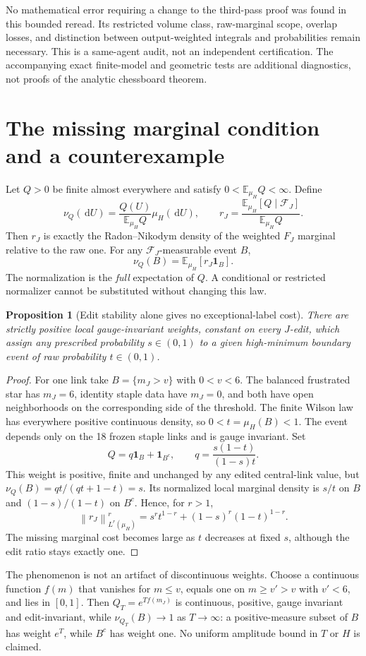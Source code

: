 \documentclass[11pt]{article}
\newtheorem{proposition}[theorem]{Proposition}
\theoremstyle{definition}
\theoremstyle{remark}
\newcommand{\one}{\mathbf 1}
\newcommand{\E}{\mathbb E}
\newcommand{\dd}{\,\mathrm d}
\newcommand{\norm}[1]{\left\lVert#1\right\rVert}
\begin{document}
No mathematical error requiring a change to the third-pass proof was
found in this bounded reread. Its restricted volume class, raw-marginal
scope, overlap losses, and distinction between output-weighted integrals
and probabilities remain necessary. This is a same-agent audit, not an
independent certification. The accompanying exact finite-model and
geometric tests are additional diagnostics, not proofs of the analytic
chessboard theorem.

\section{The missing marginal condition and a counterexample}
Let $Q>0$ be finite almost everywhere and satisfy
$0<\E_{\mu_H}Q<\infty$. Define
\[
 \nu_Q(\dd U)=\frac{Q(U)}{\E_{\mu_H}Q}\mu_H(\dd U),\qquad
 r_J=\frac{\E_{\mu_H}[Q\mid\mathcal F_J]}{\E_{\mu_H}Q}.
\]
Then $r_J$ is exactly the Radon--Nikodym density of the weighted
$F_J$ marginal relative to the raw one. For any $\mathcal F_J$-measurable
event $B$,
\begin{equation}
 \nu_Q(B)=\E_{\mu_H}[r_J\one_B].
 \label{eq:marginal}
\end{equation}
The normalization is the \emph{full} expectation of $Q$. A conditional or
restricted normalizer cannot be substituted without changing this law.

\begin{proposition}[Edit stability alone gives no exceptional-label cost]
\label{prop:counterexample}
There are strictly positive local gauge-invariant weights, constant on
every $J$-edit, which assign any prescribed probability $s\in(0,1)$ to
a given high-minimum boundary event of raw probability $t\in(0,1)$.
\end{proposition}
\begin{proof}
For one link take $B=\{m_J>v\}$ with $0<v<6$. The balanced frustrated
star has $m_J=6$, identity staple data have $m_J=0$, and both have open
neighborhoods on the corresponding side of the threshold. The finite
Wilson law has everywhere positive continuous density, so $0<t=\mu_H(B)<1$.
The event depends only on the 18 frozen staple links and is gauge invariant.
Set
\[
 Q=q\one_B+\one_{B^c},\qquad q=\frac{s(1-t)}{(1-s)t}.
\]
This weight is positive, finite and unchanged by any edited central-link
value, but $\nu_Q(B)=qt/(qt+1-t)=s$. Its normalized local marginal density
is $s/t$ on $B$ and $(1-s)/(1-t)$ on $B^c$. Hence, for $r>1$,
\begin{equation}
 \norm{r_J}_{L^r(\mu_H)}^r
 =s^r t^{1-r}+(1-s)^r(1-t)^{1-r}.
 \label{eq:sharpness}
\end{equation}
The missing marginal cost becomes large as $t$ decreases at fixed $s$,
although the edit ratio stays exactly one.
\end{proof}
The phenomenon is not an artifact of discontinuous weights. Choose a
continuous function $f(m)$ that vanishes for $m\le v$, equals one on
$m\ge v'>v$ with $v'<6$, and lies in $[0,1]$. Then $Q_T=e^{Tf(m_J)}$
is continuous, positive, gauge invariant and edit-invariant, while
$\nu_{Q_T}(B)\to1$ as $T\to\infty$: a positive-measure subset of $B$
has weight $e^T$, while $B^c$ has weight one. No uniform amplitude bound
in $T$ or $H$ is claimed.
\end{document}

